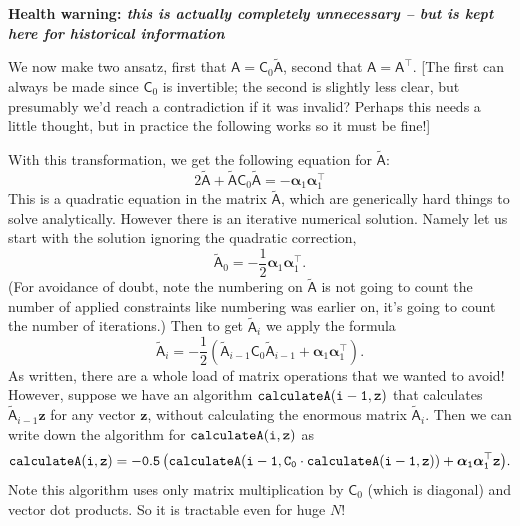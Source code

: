 \documentclass[11pt,a4paper,preprint]{aastex}
\newcommand{\bmath}[1]{\ensuremath{\bm{#1}}}
\renewcommand{\vec}[1]{\bmath{#1}}
\begin{document}
{\bf Health warning: \it this is actually completely unnecessary -- but is kept here for
  historical information}

 We now make two ansatz, first that
$\mathsf{A} = \mathsf{C}_0 \tilde{\mathsf{A}}$, second that $\mathsf{A} =
\mathsf{A}^{\top}$. [The first can always be made since $\mathsf{C}_0$
is invertible; the second is slightly less clear, but presumably we'd
reach a contradiction if it was invalid? Perhaps this needs a little
thought, but in practice the following works so it must be fine!]

With this transformation, we get the following equation for $\tilde{\mathsf{A}}$:
\begin{equation}
2 \tilde{\mathsf{A}} + \tilde{\mathsf{A}} \mathsf{C}_0
\tilde{\mathsf{A}} = - \vec{\alpha}_1 \vec{\alpha}_1^{\top}
\end{equation}
This is a quadratic equation in the matrix $\tilde{\mathsf{A}}$, which
are generically hard things to solve analytically. However there is an
iterative numerical solution. Namely let us start with the solution
ignoring the quadratic correction,
\begin{equation}
\tilde{\mathsf{A}}_0 = -\frac{1}{2} \vec{\alpha}_1 \vec{\alpha}_1^{\top}\textrm{.}
\end{equation}
(For avoidance of doubt, note the numbering on $\tilde{\mathsf{A}}$ is
not going to count the number of applied constraints like numbering
was earlier on, it's going to count the number of iterations.) Then to
get $\tilde{\mathsf{A}}_{i}$ we apply the formula
\begin{equation}
\tilde{\mathsf{A}}_{i} = -\frac{1}{2} \left(\tilde{\mathsf{A}}_{i-1}
  \mathsf{C}_0 \tilde{\mathsf{A}}_{i-1} + \vec{\alpha}_1 \vec{\alpha}_1^{\top} \right)\textrm{.}
\end{equation}
As written, there are a whole load of matrix operations that we wanted
to avoid! However, suppose we have an algorithm ${\tt calculateA(i-1,z)}$
that calculates $\tilde{\mathsf{A}}_{i-1} \vec{z}$ for any vector
$\vec{z}$, without calculating the enormous matrix
$\tilde{\mathsf{A}}_i$. Then we can write down the algorithm for ${\tt
  calculateA(i,z)}$ as
\begin{equation}
{\tt calculateA(i,z) = -0.5 \left(calculateA(i-1, C_0 \cdot calculateA(i-1,
  z)) + \vec{\alpha}_1 \vec{\alpha}_1^{\top} \vec{z} \right)}\textrm{.}
\end{equation}
Note this algorithm uses only matrix multiplication by $\mathsf{C}_0$
(which is diagonal) and vector dot products. So it is tractable even
for huge $N$!
\end{document}
